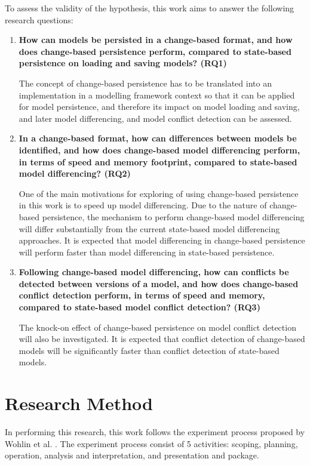 To assess the validity of the hypothesis, this work aims to answer the following research questions: 
\begin{enumerate} 
  \item \textbf{How can models be persisted in a change-based format, and how does change-based persistence perform, compared to state-based persistence on loading and saving models? (RQ1)} 
  
  The concept of change-based persistence has to be translated into an implementation in a modelling framework context so that it can be applied for model persistence, and therefore its impact on model loading and saving, and later model differencing, and model conflict detection can be assessed.
  
  \item \textbf{In a change-based format, how can differences between models be identified, and how does change-based model differencing perform, in terms of speed and memory footprint, compared to state-based model differencing? (RQ2)} 
  
  One of the main motivations for exploring of using change-based persistence in this work is to speed up model differencing. Due to the nature of change-based persistence, the mechanism to perform change-based model differencing will differ substantially from the current state-based model differencing approaches. It is expected that model differencing in change-based persistence will perform faster than model differencing in state-based persistence.        
  
  \item \textbf{Following change-based model differencing, how can conflicts be detected between versions of a model, and  how does change-based conflict detection perform, in terms of speed and memory, compared to state-based model conflict detection? (RQ3)} 
  
  The knock-on effect of change-based persistence on model conflict detection will also be investigated. It is expected that conflict detection of change-based models will be significantly faster than conflict detection of state-based models.
\end{enumerate}

\section{Research Method}
\label{sec:research_method}
In performing this research, this work follows the experiment process proposed by Wohlin et al. \cite{DBLP:books/daglib/0029933/Wohlin}. The experiment process consist of 5 activities: scoping, planning, operation, analysis and interpretation, and presentation and package.

